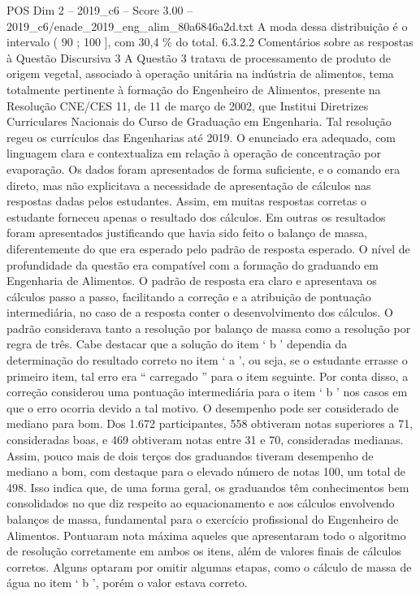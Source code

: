 \begin{textsample}{POS Dim 2 – 2019\_c6 – Score 3.00 – 2019\_c6/enade\_2019\_eng\_alim\_80a6846a2d.txt}
A moda dessa distribuição é o intervalo ( 90 ; 100 ], com 30,4 \% do total. 6.3.2.2 Comentários sobre as respostas à Questão Discursiva 3 A Questão 3 tratava de processamento de produto de origem vegetal, associado à operação unitária na indústria de alimentos, tema totalmente pertinente à formação do Engenheiro de Alimentos, presente na Resolução CNE/CES 11, de 11 de março de 2002, que Institui Diretrizes Curriculares Nacionais do Curso de Graduação em Engenharia.
Tal resolução regeu os currículos das Engenharias até 2019.
O enunciado era adequado, com linguagem clara e contextualiza em relação à operação de concentração por evaporação.
Os dados foram apresentados de forma suficiente, e o comando era direto, mas não explicitava a necessidade de apresentação de cálculos nas respostas dadas pelos estudantes.
Assim, em muitas respostas corretas o estudante forneceu apenas o resultado dos cálculos.
Em outras os resultados foram apresentados justificando que havia sido feito o balanço de massa, diferentemente do que era esperado pelo padrão de resposta esperado.
O nível de profundidade da questão era compatível com a formação do graduando em Engenharia de Alimentos.
O padrão de resposta era claro e apresentava os cálculos passo a passo, facilitando a correção e a atribuição de pontuação intermediária, no caso de a resposta conter o desenvolvimento dos cálculos.
O padrão considerava tanto a resolução por balanço de massa como a resolução por regra de três.
Cabe destacar que a solução do item ‘ b ’ dependia da determinação do resultado correto no item ‘ a ’, ou seja, se o estudante errasse o primeiro item, tal erro era “ carregado ” para o item seguinte.
Por conta disso, a correção considerou uma pontuação intermediária para o item ‘ b ’ nos casos em que o erro ocorria devido a tal motivo.
O desempenho pode ser considerado de mediano para bom.
Dos 1.672 participantes, 558 obtiveram notas superiores a 71, consideradas boas, e 469 obtiveram notas entre 31 e 70, consideradas medianas.
Assim, pouco mais de dois terços dos graduandos tiveram desempenho de mediano a bom, com destaque para o elevado número de notas 100, um total de 498.
Isso indica que, de uma forma geral, os graduandos têm conhecimentos bem consolidados no que diz respeito ao equacionamento e aos cálculos envolvendo balanços de massa, fundamental para o exercício profissional do Engenheiro de Alimentos.
Pontuaram nota máxima aqueles que apresentaram todo o algoritmo de resolução corretamente em ambos os itens, além de valores finais de cálculos corretos.
Alguns optaram por omitir algumas etapas, como o cálculo de massa de água no item ‘ b ’, porém o valor estava correto.

\end{textsample}
